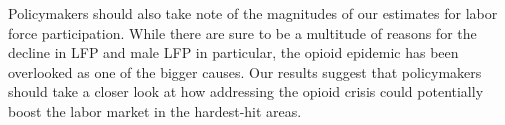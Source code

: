 \documentclass[12pt]{article}
\begin{document}
Policymakers should also take note of the magnitudes of our estimates for labor force participation.  While there are sure to be a multitude of reasons for the decline in LFP and male LFP in particular, the opioid epidemic has been overlooked as one of the bigger causes.  Our results suggest that policymakers should take a closer look at how addressing the opioid crisis could potentially boost the labor market in the hardest-hit areas.


\newpage

\printbibliography{}
\end{document}
